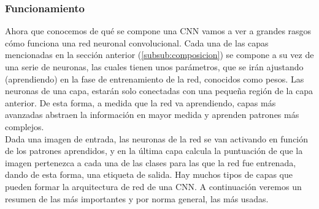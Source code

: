 \documentclass[a4paper,11pt]{book}
\begin{document}
\subsubsection{Funcionamiento}\label{sub:funcionamientoCnn}
Ahora que conocemos de qué se compone una CNN vamos a ver a grandes rasgos cómo funciona una red neuronal convolucional. Cada una de las capas mencionadas en la sección anterior (\ref{subsub:composicion}) se compone a su vez de una serie de neuronas, las cuales tienen unos parámetros, que se irán ajustando (aprendiendo) en la fase de entrenamiento de la red, conocidos como pesos. Las neuronas de una capa, estarán solo conectadas con una pequeña región de la capa anterior. De esta forma, a medida que la red va aprendiendo, capas más avanzadas abstraen la información en mayor medida y aprenden patrones más complejos.\\
Dada una imagen de entrada, las neuronas de la red se van activando en función de los patrones aprendidos, y en la última capa calcula la puntuación de que la imagen pertenezca a cada una de las clases para las que la red fue entrenada, dando de esta forma, una etiqueta de salida. Hay muchos tipos de capas que pueden formar la arquitectura de red de una CNN. A continuación veremos un resumen de las más importantes y por norma general, las más usadas.
\end{document}
